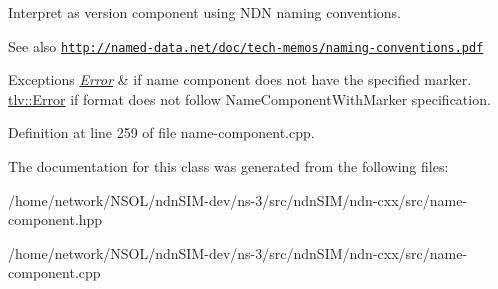 Interpret as version component using N\+DN naming conventions. 

\begin{DoxySeeAlso}{See also}
\href{http://named-data.net/doc/tech-memos/naming-conventions.pdf}{\tt http\+://named-\/data.\+net/doc/tech-\/memos/naming-\/conventions.\+pdf}
\end{DoxySeeAlso}

\begin{DoxyExceptions}{Exceptions}
{\em \hyperlink{classndn_1_1name_1_1Component_1_1Error}{Error}} & if name component does not have the specified marker. \hyperlink{classndn_1_1tlv_1_1Error}{tlv\+::\+Error} if format does not follow Name\+Component\+With\+Marker specification. \\
\hline
\end{DoxyExceptions}


Definition at line 259 of file name-\/component.\+cpp.



The documentation for this class was generated from the following files\+:\begin{DoxyCompactItemize}
\item 
/home/network/\+N\+S\+O\+L/ndn\+S\+I\+M-\/dev/ns-\/3/src/ndn\+S\+I\+M/ndn-\/cxx/src/name-\/component.\+hpp\item 
/home/network/\+N\+S\+O\+L/ndn\+S\+I\+M-\/dev/ns-\/3/src/ndn\+S\+I\+M/ndn-\/cxx/src/name-\/component.\+cpp\end{DoxyCompactItemize}
